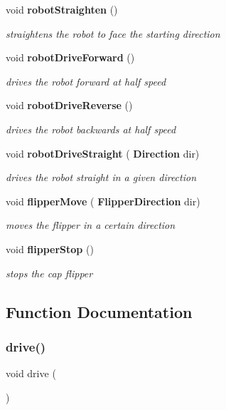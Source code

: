 \begin{DoxyCompactItemize}
void \textbf{ robot\+Straighten} ()
\begin{DoxyCompactList}\small\item\em straightens the robot to face the starting direction \end{DoxyCompactList}\item 
void \textbf{ robot\+Drive\+Forward} ()
\begin{DoxyCompactList}\small\item\em drives the robot forward at half speed \end{DoxyCompactList}\item 
void \textbf{ robot\+Drive\+Reverse} ()
\begin{DoxyCompactList}\small\item\em drives the robot backwards at half speed \end{DoxyCompactList}\item 
void \textbf{ robot\+Drive\+Straight} (\textbf{ Direction} dir)
\begin{DoxyCompactList}\small\item\em drives the robot straight in a given direction \end{DoxyCompactList}\item 
void \textbf{ flipper\+Move} (\textbf{ Flipper\+Direction} dir)
\begin{DoxyCompactList}\small\item\em moves the flipper in a certain direction \end{DoxyCompactList}\item 
void \textbf{ flipper\+Stop} ()
\begin{DoxyCompactList}\small\item\em stops the cap flipper \end{DoxyCompactList}\end{DoxyCompactItemize}


\subsection{Function Documentation}
\mbox{\label{drive_8c_a928e32686c7e00c1ecde24c3da3019f7}} 
\subsubsection{drive()}
{\footnotesize\ttfamily void drive (\begin{DoxyParamCaption}{ }\end{DoxyParamCaption})}



